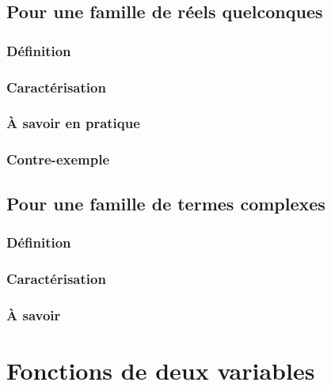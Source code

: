 \documentclass[12pt,a4paper,french]{book}
\begin{document}
	\section{Pour une famille de réels quelconques}
		\subsection{Définition}
		\subsection{Caractérisation}
		\subsection{À savoir en pratique}
		\subsection{Contre-exemple}
	\section{Pour une famille de termes complexes}
		\subsection{Définition}
		\subsection{Caractérisation}
		\subsection{À savoir}
		
\chapter{Fonctions de deux variables}



	
	
	
	
	
	
	
	
\end{document}
